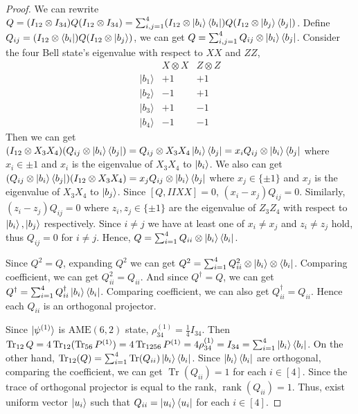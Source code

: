 \begin{proof}
    We can rewrite $Q=(I_{12}\otimes I_{34})Q(I_{12}\otimes I_{34})=\sum_{i,j=1}^4(I_{12}\otimes \ket{b_i}\bra{b_i})Q(I_{12}\otimes \ket{b_j}\bra{b_j})$. Define $Q_{ij}=(I_{12}\otimes \bra{b_i})Q(I_{12}\otimes \ket{b_j})$, we can get $Q=\sum_{i,j=1}^4Q_{ij}\otimes\ket{b_i}\bra{b_j}$. Consider the four Bell state's eigenvalue with respect to $XX$ and $ZZ$,
    \[
\begin{array}{c|cc}
 & X\otimes X & Z\otimes Z \\ \hline
|b_1\rangle & +1 & +1 \\
|b_2\rangle & -1 & +1 \\
|b_3\rangle & +1 & -1 \\
|b_4\rangle & -1 & -1
\end{array}
\]
    Then we can get $(I_{12}\otimes X_3X_4)(Q_{ij}\otimes \ket{b_i}\bra{b_j})=Q_{ij}\otimes X_3X_4\ket{b_i}\bra{b_j}=x_iQ_{ij}\otimes\ket{b_i}\bra{b_j}$ where $x_i\in{\pm 1}$ and $x_i$ is the eigenvalue of $X_3X_4$ to $\ket{b_i}$. We also can get $(Q_{ij}\otimes \ket{b_i}\bra{b_j})(I_{12}\otimes X_3X_4)=x_jQ_{ij}\otimes \ket{b_i}\bra{b_j}$ where $x_j\in\{\pm 1\}$ and $x_j$ is the eigenvalue of $X_3X_4$ to $\ket{b_j}$. Since $[Q,IIXX]=0$, $(x_i-x_j)Q_{ij}=0$. Similarly, $(z_i-z_j)Q_{ij}=0$ where $z_i,z_j\in \{\pm 1\}$ are the eigenvalue of $Z_3Z_4$ with respect to $\ket{b_i},\ket{b_j}$ respectively. Since $i\neq j$ we have at least one of $x_i\neq x_j$ and $z_i\neq z_j$ hold, thus $Q_{ij}=0$ for $i\neq j$. Hence, $Q=\sum_{i=1}^4Q_{ii}\otimes \ket{b_i}\bra{b_i}$.

    Since $Q^2=Q$, expanding $Q^2$ we can get $Q^2=\sum_{i=1}^4 Q_{ii}^2\otimes \ket{b_i}\otimes\bra{b_i}$. Comparing coefficient, we can get $Q_{ii}^2=Q_{ii}$. And since $Q^\dagger=Q$, we can get $Q^\dagger=\sum_{i=1}^4 Q_{ii}^\dagger \ket{b_i}\bra{b_i}$. Comparing coefficient, we can also get $Q_{ii}^\dagger=Q_{ii}$. Hence each $Q_{ii}$ is an orthogonal projector.

    Since $\ket{\psi^{(1)}}$ is $\mathrm{AME}(6,2)$ state, $\rho_{34}^{(1)}=\frac{1}{4}I_{34}$. Then $\operatorname{Tr}_{12}Q=4\operatorname{Tr}_{12}(\operatorname{Tr}_{56}P^{(1)})=4\operatorname{Tr}_{1256}P^{(1)}=4\rho_{34}^{(1)}=I_{34}=\sum_{i=1}^4\ket{b_i}\bra{b_i}$. On the other hand, $\operatorname{Tr}_{12}(Q)=\sum_{i=1}^4\operatorname{Tr}(Q_{ii})\ket{b_i}\bra{b_i}$. Since $\ket{b_i}\bra{b_i}$ are orthogonal, comparing the coefficient, we can get $\operatorname{Tr}(Q_{ii})=1$ for each $i\in [4]$. Since the trace of orthogonal projector is equal to the rank, $\operatorname{rank}(Q_{ii})=1$. Thus, exist uniform vector $\ket{u_i}$ such that $Q_{ii}=\ket{u_i}\bra{u_i}$ for each $i\in [4]$.


\end{proof}
